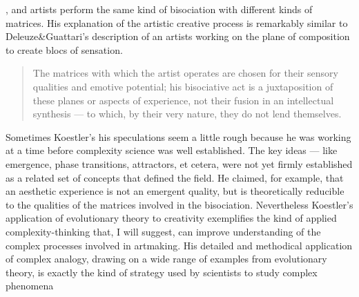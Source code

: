 {            }, and artists perform the same kind of bisociation with different kinds of matrices. His explanation of the artistic creative process is remarkably similar to Deleuze\&Guattari's description of an artists working on the plane of composition to create blocs of sensation.

            \begin{quote}
                The matrices with which the artist operates are chosen for their sensory qualities and emotive potential; his bisociative act is a juxtaposition of these planes or aspects of experience, not their fusion in an intellectual synthesis — to which, by their very nature, they do not lend themselves.\citep[p.352]{KoestlerThActOfCrtn1964}
            \end{quote}

            Sometimes Koestler's his speculations seem a little rough because he was working at a time before complexity science was well established. The key ideas — like emergence, phase transitions, attractors, et cetera, were not yet firmly established as a related set of concepts that defined the field. He claimed, for example, that an aesthetic experience is not an emergent quality, but is theoretically reducible to the qualities of the matrices involved in the bisociation. Nevertheless Koestler's application of evolutionary theory to creativity exemplifies the kind of applied complexity-thinking that, I will suggest, can improve understanding of the complex processes involved in artmaking. His detailed and methodical application of complex analogy, drawing on a wide range of examples from evolutionary theory, is exactly the kind of strategy used by scientists to study complex phenomena
           
